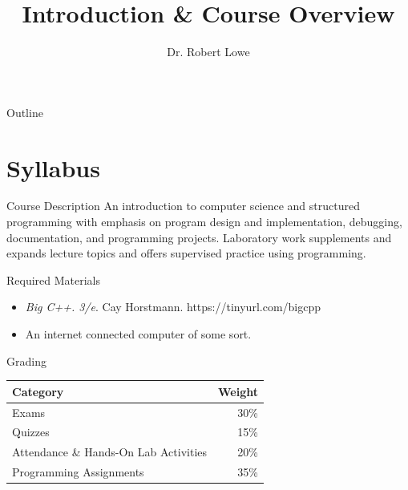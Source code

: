 \documentclass{beamer}
\title{Introduction \& Course Overview}
\author{Dr. Robert Lowe\\}
\institute[Maryville College] %
{
  Division of Mathematics and Computer Science\\
  Maryville College
}
\date[]{}
\begin{document}
\begin{frame}
  \titlepage
\end{frame}

\begin{frame}{Outline}
  \tableofcontents
\end{frame}





\section{Syllabus}
\begin{frame}{Course Description}
An introduction to computer science and structured programming with
emphasis on program design and implementation, debugging,
documentation, and programming projects. Laboratory work supplements
and expands lecture topics and offers supervised practice using
programming. 
\end{frame}

\begin{frame}{Required Materials}
\begin{itemize}
    \item {\em Big C++. 3/e}. Cay Horstmann.
    https://tinyurl.com/bigcpp
    \item An internet connected computer of some sort.
\end{itemize}
\end{frame}

\begin{frame}{Grading}
\begin{tabular}{|l|r|}
\hline
{\bf Category} & {\bf Weight}\\
\hline
Exams & 30\%\\
\hline
Quizzes & 15\% \\
\hline
Attendance \& Hands-On Lab Activities & 20\% \\
\hline
Programming Assignments & 35\%\\
\hline
\end{tabular}
\end{frame}
\end{document}
